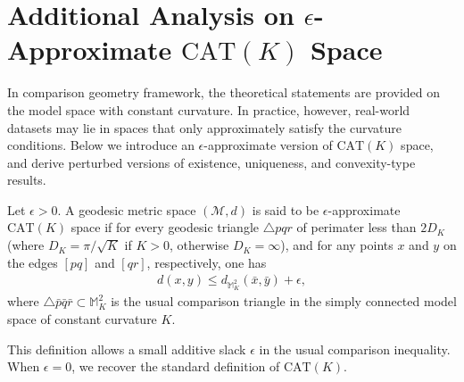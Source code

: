 \clearpage

\section{Additional Analysis on $\epsilon$-Approximate $\mathrm{CAT}(K)$ Space}
\label{sec:additional_analysis_approximate_cat_k}
In comparison geometry framework, the theoretical statements are provided on the model space with constant curvature.
In practice, however, real-world datasets may lie in spaces that only approximately satisfy the curvature conditions.
Below we introduce an $\epsilon$-approximate version of $\mathrm{CAT}(K)$ space, and derive perturbed versions of existence, uniqueness, and convexity-type results.
\begin{definition}
    Let $\epsilon > 0$.
    A geodesic metric space $(\mathcal{M}, d)$ is said to be $\epsilon$-approximate $\mathrm{CAT}(K)$ space if for every geodesic triangle $\triangle pqr$ of perimater less than $2D_K$ (where $D_K = \pi / \sqrt{K}$ if $K > 0$, otherwise $D_K = \infty$), and for any points $x$ and $y$ on the edges $[pq]$ and $[qr]$, respectively, one has
    \begin{align}
        d(x, y) \leq d_{\mathbb{M}^2_K}(\bar{x}, \bar{y}) + \epsilon,
    \end{align}
    where $\triangle \bar{p}\bar{q}\bar{r} \subset \mathbb{M}_K^2$ is the usual comparison triangle in the simply connected model space of constant curvature $K$.
\end{definition}
This definition allows a small additive slack $\epsilon$ in the usual comparison inequality.
When $\epsilon = 0$, we recover the standard definition of $\mathrm{CAT}(K)$.

